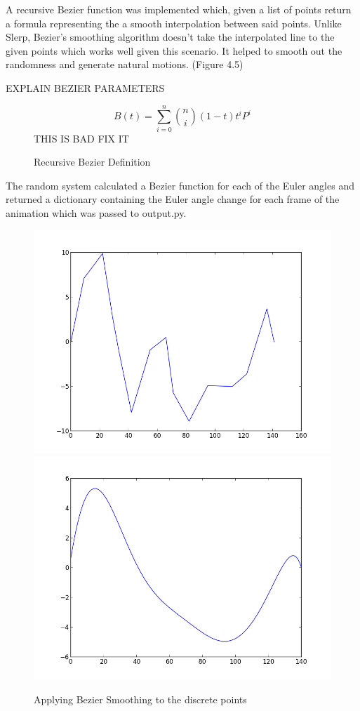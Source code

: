 \documentclass[bsc,frontabs,twoside,singlespacing,parskip]{infthesis}
\begin{document}
A recursive Bezier function was implemented which, given a list of points return a formula representing the a smooth interpolation between said points. Unlike Slerp, Bezier's smoothing algorithm doesn't take the interpolated line to the given points which works well given this scenario. It helped to smooth out the randomness and generate natural motions. (Figure 4.5)

EXPLAIN BEZIER PARAMETERS \\

\begin{figure}
	$$ B(t) = \sum_{i=0}^n {n \choose i} (1-t) t^i P^i $$ THIS IS BAD FIX IT\\
	\caption{Recursive Bezier Definition} 
\end{figure}

The random system calculated a Bezier function for each of the Euler angles and returned a dictionary containing the Euler angle change for each frame of the animation which was passed to output.py.


\begin{figure}
	\includegraphics[width=.5\textwidth]{figure_1.png}
	\includegraphics[width=.5\textwidth]{figure_2.png}
	\caption{Applying Bezier Smoothing to the discrete points}
\end{figure}
\end{document}
